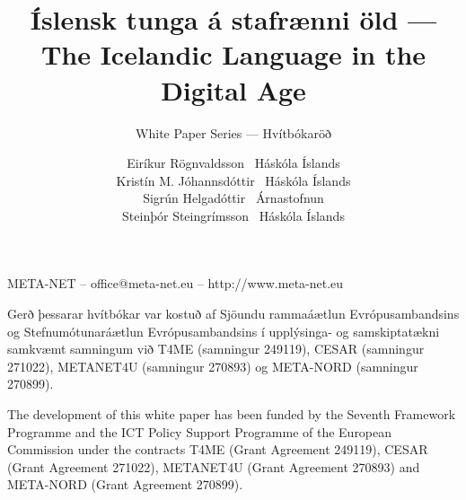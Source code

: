 \documentclass{../../metanetpaper}
\title{Íslensk tunga á stafrænni öld --- The Icelandic Language in the Digital Age}
\subtitle{White Paper Series --- Hvítbókaröð}
\author{
  Eiríkur Rögnvaldsson~ {\small Háskóla Íslands}\\
  Kristín M. Jóhannsdóttir~ {\small Háskóla Íslands}\\
  Sigrún Helgadóttir~ {\small Árnastofnun} \\
  Steinþór Steingrímsson~ {\small Háskóla Íslands}
}
\begin{document}

\maketitle

\null
\pagestyle{empty} 

\centerline{META-NET -- office@meta-net.eu -- http://www.meta-net.eu}

\vfill

\begin{small}
Gerð þessarar hvítbókar var kostuð af Sjöundu rammaáætlun Evrópusambandsins og Stefnumótunaráætlun Evrópusambandsins í upplýsinga- og samskiptatækni samkvæmt samningum við T4ME (samningur 249119), CESAR (samningur 271022), META\-NET4U (samningur 270893) og META-NORD (samningur 270899).
\end{small}

\bigskip
\begin{small}
  The development of this white paper has been funded by the Seventh
  Framework Programme and the ICT Policy Support Programme of the
  European Commission under the contracts T4ME (Grant Agreement 249119),
  CESAR (Grant Agreement 271022), META\-NET4U (Grant Agreement 270893)
  and META-NORD (Grant Agreement 270899).
\end{small}

\clearpage

\setcounter{page}{5}
\pagestyle{scrheadings}

\cleardoublepage


\end{document}

